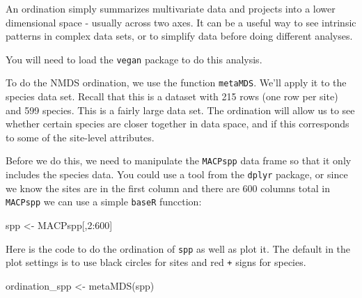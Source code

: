 \documentclass[
]{book}
\newenvironment{Shaded}{\begin{snugshade}}{\end{snugshade}}
\newcommand{\DecValTok}[1]{\textcolor[rgb]{0.00,0.00,0.81}{#1}}
\newcommand{\FunctionTok}[1]{\textcolor[rgb]{0.00,0.00,0.00}{#1}}
\newcommand{\NormalTok}[1]{#1}
\newcommand{\OtherTok}[1]{\textcolor[rgb]{0.56,0.35,0.01}{#1}}
\newcommand{\SpecialCharTok}[1]{\textcolor[rgb]{0.00,0.00,0.00}{#1}}
\begin{document}
An ordination simply summarizes multivariate data and projects into a lower dimensional space - usually across two axes. It can be a useful way to see intrinsic patterns in complex data sets, or to simplify data before doing different analyses.

You will need to load the \texttt{vegan} package to do this analysis.

To do the NMDS ordination, we use the function \texttt{metaMDS}. We'll apply it to the species data set. Recall that this is a dataset with 215 rows (one row per site) and 599 species. This is a fairly large data set. The ordination will allow us to see whether certain species are closer together in data space, and if this corresponds to some of the site-level attributes.

Before we do this, we need to manipulate the \texttt{MACPspp} data frame so that it only includes the species data. You could use a tool from the \texttt{dplyr} package, or since we know the sites are in the first column and there are 600 columns total in \texttt{MACPspp} we can use a simple \texttt{baseR} funcction:

\begin{Shaded}
\begin{Highlighting}[]
\NormalTok{spp }\OtherTok{\textless{}{-}}\NormalTok{ MACPspp[,}\DecValTok{2}\SpecialCharTok{:}\DecValTok{600}\NormalTok{]}
\end{Highlighting}
\end{Shaded}

Here is the code to do the ordination of \texttt{spp} as well as plot it. The default in the plot settings is to use black circles for sites and red \texttt{+} signs for species.

\begin{Shaded}
\begin{Highlighting}[]
\NormalTok{ordination\_spp }\OtherTok{\textless{}{-}} \FunctionTok{metaMDS}\NormalTok{(spp)}
\end{Highlighting}
\end{Shaded}
\end{document}

